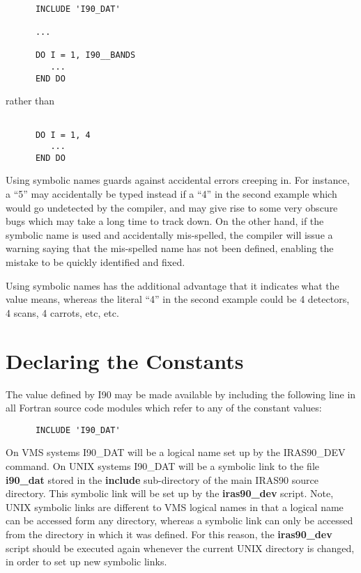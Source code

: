 \small
\begin{verbatim}

      INCLUDE 'I90_DAT'

      ...

      DO I = 1, I90__BANDS
         ...
      END DO

\end{verbatim}
\normalsize

rather than 

\small
\begin{verbatim}

      DO I = 1, 4
         ...
      END DO

\end{verbatim}
\normalsize

Using symbolic names guards against accidental errors creeping in. For instance,
a ``5'' may accidentally be typed instead if a ``4'' in the second example which
would go undetected by the compiler, and may give rise to some very obscure bugs
which may take a long time to track down. On the other hand, if the symbolic
name is used and accidentally mis-spelled, the compiler will issue a warning
\footnotemark saying that the mis-spelled name has not been defined, enabling
the mistake to be quickly identified and fixed. 

Using symbolic names has the additional advantage that it indicates what the
value means, whereas the literal ``4'' in the second example could be 4
detectors, 4 scans, 4 carrots, etc, etc. 

\section{Declaring the Constants}

The value defined by I90 may be made available by including the following line
in all Fortran source code modules which refer to any of the constant values: 

\small
\begin{verbatim}
      INCLUDE 'I90_DAT'
\end{verbatim}
\normalsize

On VMS systems I90\_DAT will be a logical name set up by the IRAS90\_DEV
command. On UNIX systems I90\_DAT will be a symbolic link to the file {\bf
i90\_dat} stored in the {\bf include} sub-directory of the main IRAS90
source directory. This symbolic link will be set up by the {\bf iras90\_dev} script.
Note, UNIX symbolic links are different to VMS logical names in that a logical
name can be accessed form any directory, whereas a symbolic link can only be
accessed from the directory in which it was defined. For this reason, the {\bf
iras90\_dev} script should be executed again whenever the current UNIX directory
is changed, in order to set up new symbolic links.

